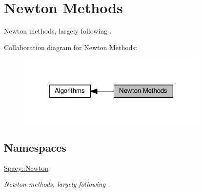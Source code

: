 \hypertarget{group__NewtonGroup}{}\section{Newton Methods}
\label{group__NewtonGroup}


Newton methods, largely following \cite{Deuflhard2004}.  


Collaboration diagram for Newton Methods\+:
\nopagebreak
\begin{figure}[H]
\begin{center}
\leavevmode
\includegraphics[width=270pt]{group__NewtonGroup}
\end{center}
\end{figure}
\subsection*{Namespaces}
\begin{DoxyCompactItemize}
\item 
 \hyperlink{namespaceSpacy_1_1Newton}{Spacy\+::\+Newton}
\begin{DoxyCompactList}\small\item\em Newton methods, largely following \cite{Deuflhard2004}. \end{DoxyCompactList}\end{DoxyCompactItemize}
